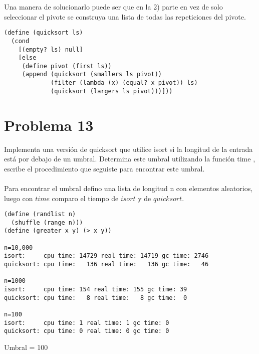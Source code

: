 \documentclass[a4paper,11pt]{article}
\theoremstyle{mytheor}
\begin{document}
Una manera de solucionarlo puede ser que en la 2) parte en vez de solo seleccionar el pivote se construya una lista de todas las repeticiones del pivote.
\begin{lstlisting}[label={list:first},caption=quicksort.]
(define (quicksort ls)
  (cond
    [(empty? ls) null]
    [else
     (define pivot (first ls))
     (append (quicksort (smallers ls pivot))
             (filter (lambda (x) (equal? x pivot)) ls)
             (quicksort (largers ls pivot)))]))
\end{lstlisting}

\section*{Problema 13}
Implementa una versión de quicksort que utilice isort si la longitud de la entrada está
por debajo de un umbral. Determina este umbral utilizando la función time , escribe el procedimiento
que seguiste para encontrar este umbral. \\ \\

Para encontrar el umbral defino una lista de longitud n con elementos aleatorios, luego con $time$ comparo el tiempo de $isort$ y de $quicksort$.
\begin{lstlisting}[label={list:second},caption=quicksort-isort-time.]
(define (randlist n)
  (shuffle (range n)))
(define (greater x y) (> x y))

n=10,000
isort:     cpu time: 14729 real time: 14719 gc time: 2746
quicksort: cpu time:   136 real time:   136 gc time:   46

n=1000
isort:     cpu time: 154 real time: 155 gc time: 39
quicksort: cpu time:   8 real time:   8 gc time:  0

n=100
isort:     cpu time: 1 real time: 1 gc time: 0
quicksort: cpu time: 0 real time: 0 gc time: 0

\end{lstlisting}
Umbral = 100
\end{document}
